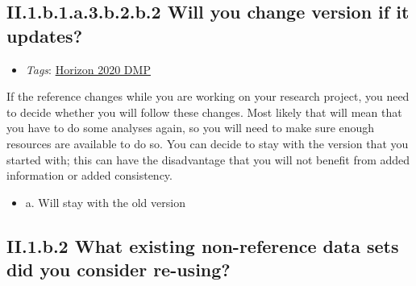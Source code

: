 \documentclass[a4paper,12pt]{report}
\begin{document}
\subsection*{\protect\textcolor{colorSecId}{II.1.b.1.a.3.b.2.b.2} Will you change version if it updates?}

\label{82fd0cce-2b41-423f-92ad-636d0872045c.efc80cc8-8318-4f8c-acb7-dc1c60e491c1.2663b978-5125-4224-9930-0a50dbe895c9.fcc51962-08df-4f4c-85ad-6bb932107010.0b1610c4-5030-43a3-8a6c-c69693351a79.58401091-2d48-4231-983a-c972d11d9f6e.8a1937d8-39dc-4efd-a3f6-b62e789f225b.10b6548c-21cd-44c8-a8de-47415e7b012e.842007ce-0951-4655-8acc-b0f582e82ea1.481d0157-6d89-4f68-9f3b-cf1b05f8f15d}


\begin{itemize}
  \item \textit{Tags}: \ul{Horizon 2020 DMP}
  \end{itemize}


\noindent
\begin{markdown}
If the reference changes while you are working on your research project, you need to decide whether you will follow these changes. Most likely that will mean that you have to do some analyses again, so you will need to make sure enough resources are available to do so. You can decide to stay with the version that you started with; this can have the disadvantage that you will not benefit from added information or added consistency.
\end{markdown}



\begin{itemize}
  \item[\CheckmarkBold] a. Will stay with the old version
\end{itemize}






\subsection*{\protect\textcolor{colorSecId}{II.1.b.2} What existing non-reference data sets did you consider re-using?}
\end{document}

